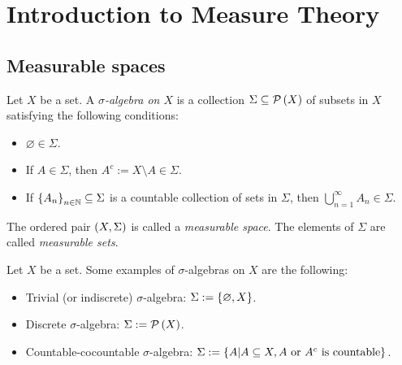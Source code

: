 \chapter{Introduction to Measure Theory}

\section{Measurable spaces}

\begin{definition}
  Let $X$ be a set. A \emph{$\sigma$-algebra on $X$} is a collection $\Sigma\subseteq\mathcal{P}\left(X\right)$ of subsets in $X$ satisfying the following conditions:

  \begin{itemize}
    \item $\varnothing\in\Sigma$.
    \item If $A\in\Sigma$, then   $A^c:=X\setminus A\in\Sigma$.
    \item If $\left\{A_n\right\}_{n\in\mathbb{N}}\subseteq\Sigma$ is a countable collection of sets in $\Sigma$, then $\bigcup_{n=1}^{\infty}{A_n}\in\Sigma$.
  \end{itemize}

  The ordered pair $\left(X,\Sigma\right)$ is called a \emph{measurable space}. The elements of $\Sigma$ are called \emph{measurable sets}.
\end{definition}

\begin{example}
  Let $X$ be a set. Some examples of $\sigma$-algebras on $X$ are the following:

  \begin{itemize}
    \item Trivial (or indiscrete) $\sigma$-algebra: $\Sigma:=\left\{\varnothing,X\right\}$.
    \item Discrete $\sigma$-algebra: $\Sigma:=\mathcal{P}\left(X\right)$.
    \item Countable-cocountable $\sigma$-algebra: $\Sigma:=\left\{A\middle|A\subseteq X,A\text{ or }A^c\text{ is countable}\right\}$.
  \end{itemize}
\end{example}

